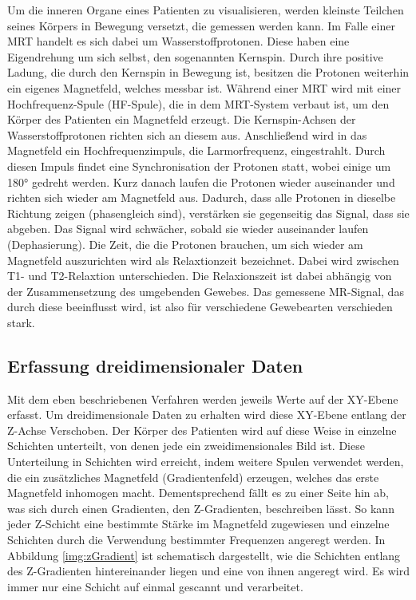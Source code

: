 Um die inneren Organe eines Patienten zu visualisieren, werden kleinste Teilchen seines Körpers in Bewegung versetzt, die gemessen werden kann. Im Falle einer MRT handelt es sich dabei um Wasserstoffprotonen. Diese haben eine Eigendrehung um sich selbst, den sogenannten Kernspin. Durch ihre positive Ladung, die durch den Kernspin in Bewegung ist, besitzen die Protonen weiterhin ein eigenes Magnetfeld, welches messbar ist. 
Während einer MRT wird mit einer Hochfrequenz-Spule (HF-Spule), die in dem MRT-System verbaut ist, um den Körper des Patienten ein Magnetfeld erzeugt. Die Kernspin-Achsen der Wasserstoffprotonen richten sich an diesem aus. Anschließend wird in das Magnetfeld ein Hochfrequenzimpuls, die Larmorfrequenz, eingestrahlt. Durch diesen Impuls findet eine Synchronisation der Protonen statt, wobei einige um 180° gedreht werden. Kurz danach laufen die Protonen wieder auseinander und richten sich wieder am Magnetfeld aus. 
Dadurch, dass alle Protonen in dieselbe Richtung zeigen (phasengleich sind), verstärken sie gegenseitig das Signal, dass sie abgeben. Das Signal wird schwächer, sobald sie wieder auseinander laufen (Dephasierung).
Die Zeit, die die Protonen brauchen, um sich wieder am Magnetfeld auszurichten wird als Relaxtionzeit bezeichnet. Dabei wird zwischen T1- und T2-Relaxtion unterschieden.
Die Relaxionszeit ist dabei abhängig von der Zusammensetzung des umgebenden Gewebes. Das gemessene MR-Signal, das durch diese beeinflusst wird, ist also für verschiedene Gewebearten verschieden stark.

\subsection{Erfassung dreidimensionaler Daten}

Mit dem eben beschriebenen Verfahren werden jeweils Werte auf der XY-Ebene erfasst. Um dreidimensionale Daten zu erhalten wird diese XY-Ebene entlang der Z-Achse Verschoben. Der Körper des Patienten wird auf diese Weise in einzelne Schichten unterteilt, von denen jede ein zweidimensionales Bild ist.
Diese Unterteilung in Schichten wird erreicht, indem weitere Spulen verwendet werden, die ein zusätzliches Magnetfeld (Gradientenfeld) erzeugen, welches das erste Magnetfeld inhomogen macht. Dementsprechend fällt es zu einer Seite hin ab, was sich durch einen Gradienten, den Z-Gradienten, beschreiben lässt. So kann jeder Z-Schicht eine bestimmte Stärke im Magnetfeld zugewiesen und einzelne Schichten durch die Verwendung bestimmter Frequenzen angeregt werden. In Abbildung \ref{img:zGradient} ist schematisch dargestellt, wie die Schichten entlang des Z-Gradienten hintereinander liegen und eine von ihnen angeregt wird.
Es wird immer nur eine Schicht auf einmal gescannt und verarbeitet.

